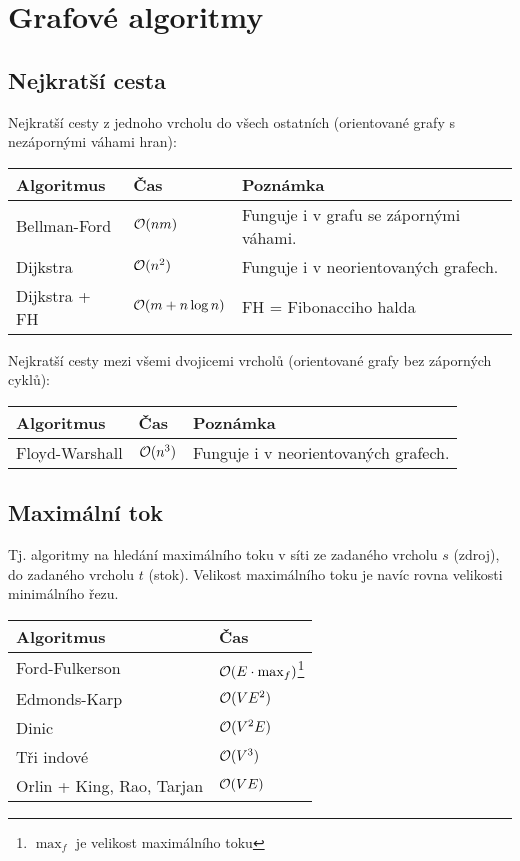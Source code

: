 \renewcommand{\arraystretch}{1.25}
\section{Grafové algoritmy}
\subsection{Nejkratší cesta}

Nejkratší cesty z jednoho vrcholu do všech ostatních (orientované grafy s
nezápornými váhami hran):

\begin{center}
\begin{tabular}{ l l p{8cm} }
	\hline
	\bf Algoritmus & \bf Čas & \bf Poznámka \\
	\hline
	Bellman-Ford & $\mathcal{O}(nm)$ & Funguje i v grafu se zápornými váhami. \\
	Dijkstra & $\mathcal{O}(n^2)$ & Funguje i v neorientovaných grafech. \\
	Dijkstra + FH & $\mathcal{O}(m + n\log n)$ & FH = Fibonacciho halda \\
	\hline
\end{tabular}
\end{center}

\noindent Nejkratší cesty mezi všemi dvojicemi vrcholů (orientované grafy bez záporných cyklů):

\begin{center}
\begin{tabular}{ l l p{8cm} }
	\hline
	\bf Algoritmus & \bf Čas & \bf Poznámka \\
	\hline
	Floyd-Warshall & $\mathcal{O}(n^3)$ & Funguje i v neorientovaných grafech. \\
	\hline
\end{tabular}
\end{center}

\subsection{Maximální tok}

Tj. algoritmy na hledání maximálního toku v síti ze zadaného vrcholu $s$
(zdroj), do zadaného vrcholu $t$ (stok). Velikost maximálního toku je navíc
rovna velikosti minimálního řezu.

\begin{center}
\begin{tabular}{ l l }
	\hline
	\bf Algoritmus & \bf Čas \\
	\hline
	Ford-Fulkerson & $\mathcal{O}(E\cdot \max_f)$\footnote{$\max_f$ je velikost maximálního toku} \\
    Edmonds-Karp & $\mathcal{O}(VE^2)$ \\
    Dinic & $\mathcal{O}(V^2E)$ \\
	Tři indové & $\mathcal{O}(V^3)$ \\
	Orlin + King, Rao, Tarjan & $\mathcal{O}(VE)$ \\
    \hline
\end{tabular}
\end{center}


